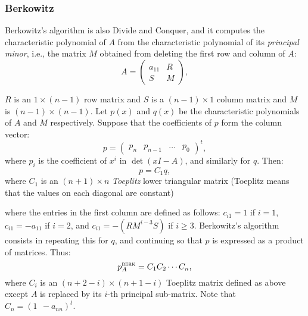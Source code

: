 \begin{frame}
\frametitle{Berkowitz}
Berkowitz's algorithm is also Divide and Conquer, and it computes
the characteristic polynomial of $A$ from the characteristic
polynomial of its {\em principal minor},
i.e., the matrix $M$ obtained from deleting the first row and column
of $A$:
$$
A=\left(\begin{array}{cc}
a_{11} & R \\
S      & M
\end{array}\right),
$$
\end{frame}

\begin{frame}
$R$ is an $1\times(n-1)$ row matrix and $S$ is a $(n-1)\times 1$
column matrix and $M$ is $(n-1)\times(n-1)$.  Let $p(x)$ and $q(x)$ be
the characteristic polynomials of $A$ and $M$ respectively.  Suppose
that the coefficients of $p$ form the column vector: 
$$
p=\left(\begin{array}{cccc}
p_n&p_{n-1}&\ldots&p_0\end{array}\right)^t,
$$
where $p_i$ is the coefficient of $x^i$ in $\det(xI-A)$, and similarly
for $q$.  Then:
$$
p=C_1q,
$$
where $C_1$ is an $(n+1)\times n$ {\em
Toeplitz} lower triangular matrix
(Toeplitz means that the values on each diagonal are constant)
\end{frame}

\begin{frame}
where the entries in the first column are defined as follows:
$c_{i1}=1$ if $i=1$, $c_{i1}=-a_{11}$ if $i=2$, and
$c_{i1}=-(RM^{i-3}S)$ if $i\geq 3$.
Berkowitz's algorithm consists in repeating this for $q$, and
continuing so that $p$ is expressed as a product of matrices.  Thus:
$$
p^{\textsc{berk}}_A=C_1C_2\cdots C_n,
$$
where $C_i$ is an $(n+2-i)\times (n+1-i)$ Toeplitz matrix defined as
above except $A$ is replaced by its $i$-th principal
sub-matrix.  Note that $C_n=(1 \ \  -a_{nn})^t$.
\end{frame}


